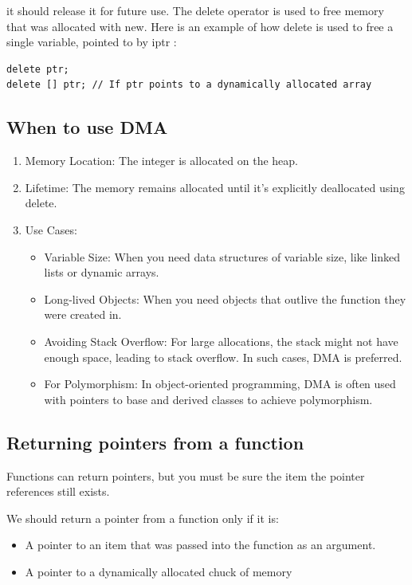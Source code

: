 \documentclass{report}
\begin{document}
    \bigbreak \noindent 
     it should
release it for future use. The delete operator is used to free memory that was allocated
with new. Here is an example of how delete is used to free a single variable, pointed to
by iptr :
    \bigbreak \noindent 
    \sepline
    \begin{verbatim}
delete ptr;
delete [] ptr; // If ptr points to a dynamically allocated array
    \end{verbatim}
    \sepline
    \bigbreak \noindent 
    \bigbreak \noindent 

    \bigbreak \noindent 
    \subsection{When to use DMA}
    \bigbreak \noindent 
    \begin{enumerate}
        \item Memory Location: The integer is allocated on the heap.
        \item Lifetime: The memory remains allocated until it's explicitly deallocated using delete.
        \item Use Cases:
        \begin{itemize}
            \item Variable Size: When you need data structures of variable size, like linked lists or dynamic arrays.
            \item Long-lived Objects: When you need objects that outlive the function they were created in.
            \item Avoiding Stack Overflow: For large allocations, the stack might not have enough space, leading to stack overflow. In such cases, DMA is preferred.
            \item For Polymorphism: In object-oriented programming, DMA is often used with pointers to base and derived classes to achieve polymorphism.
        \end{itemize}
    \end{enumerate}

    \bigbreak \noindent 
    \subsection{Returning pointers from a function}
    \bigbreak \noindent 
    \begin{concept}
 Functions can return pointers, but you must be sure the item the pointer references still exists.
	\end{concept}
    \bigbreak \noindent 
    We should return  a pointer from a function only if it is:
    \begin{itemize}
        \item A pointer to an item that was passed into the function as an argument.
        \item A pointer to a dynamically allocated chuck of memory
    \end{itemize}
\end{document}
